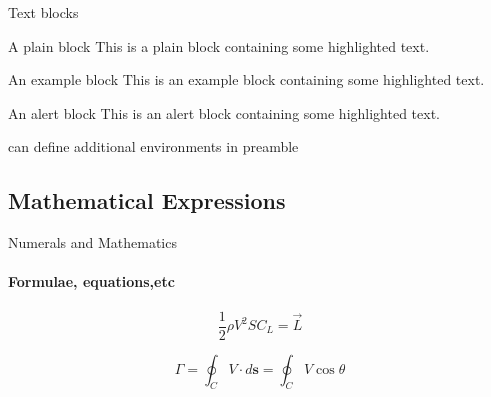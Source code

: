 \documentclass{beamer}
\begin{document}
{{\begin{frame}[label=simmonshall]{Text blocks}
      \begin{block}{A plain block}
        This is a plain block containing some \alert{highlighted text}.
      \end{block}
      \begin{exampleblock}{An example block}
        This is an example block containing some \alert{highlighted text}.
      \end{exampleblock}
      \begin{alertblock}{An alert block}
        This is an alert block containing some \alert{highlighted text}.
      \end{alertblock}
      
      can define additional environments in preamble
    \end{frame}

   

    \subsection{Mathematical Expressions}
    \begin{frame}[label=math]{Numerals and Mathematics}
      \framesubtitle{Formulae, equations,etc}
      \begin{equation}
         \frac{1}{2} \rho V^2 S C_{L} = \Vec{L}
      \end{equation}
      
      \begin{equation}
         \Gamma =\oint _{{C}}V\cdot d{\mathbf  {s}}=\oint_{{C}}V\cos \theta 
      \end{equation}
    \end{frame}

}}
\end{document}
